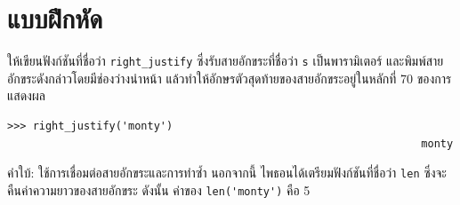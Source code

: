 \section{แบบฝึกหัด}

\begin{exercise}

ให้เขียนฟังก์ชันที่ชื่อว่า \verb"right_justify" ซึ่งรับสายอักขระที่ชื่อว่า {\tt s} เป็นพารามิเตอร์ และพิมพ์สายอักขระดังกล่าวโดยมีช่องว่างนำหน้า แล้วทำให้อักษรตัวสุดท้ายของสายอักขระอยู่ในหลักที่ 70 ของการแสดงผล 

\begin{verbatim}
>>> right_justify('monty')
                                                                 monty
\end{verbatim}

คำใบ้: ใช้การเชื่อมต่อสายอักขระและการทำซ้ำ นอกจากนี้ ไพธอนได้เตรียมฟังก์ชันที่ชื่อว่า {\tt len} ซึ่งจะคืนค่าความยาวของสายอักขระ ดังนั้น ค่าของ \verb"len('monty')" คือ 5

\end{exercise}



